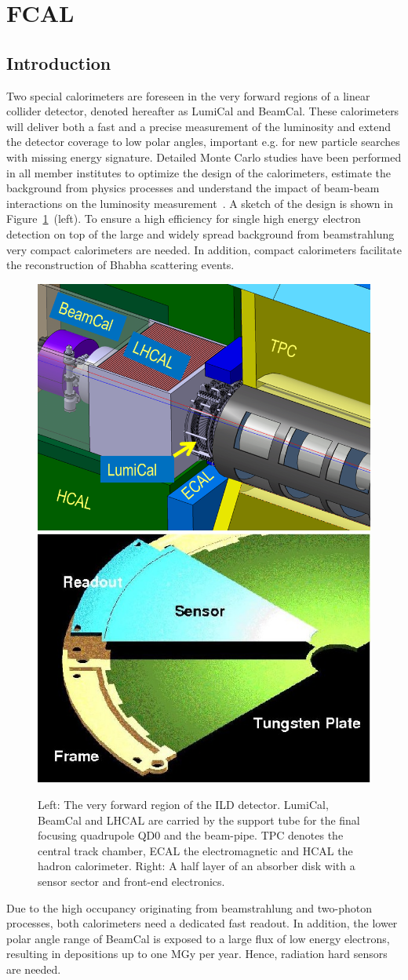 \section{FCAL}
\subsection{Introduction}
Two special calorimeters are foreseen in the very forward regions of a linear collider detector, denoted hereafter as
LumiCal and BeamCal.
These calorimeters will deliver both a fast and a precise measurement of the luminosity
and extend the detector coverage to low polar angles,
important e.g. for new particle searches with missing energy signature.
Detailed Monte Carlo studies have been performed in all member institutes to
optimize the design of the calorimeters, estimate the background from physics processes and understand the impact
of beam-beam interactions on the luminosity measurement~\cite{2010JInst...512002A}.
A sketch of the design is shown in Figure~\ref{fig:Forward_structure}~(left).
To ensure a high efficiency for single high energy electron detection on top of the large and widely spread
background from beamstrahlung  very compact calorimeters are needed. In addition, compact calorimeters facilitate
the reconstruction of Bhabha scattering events.
\begin{figure}[hbp]
  \centering
   \includegraphics[width=0.45\columnwidth]{Calorimeter/FCAL/figs/forward_region_new} \hfill
   \includegraphics[width=0.45\columnwidth]{Calorimeter/FCAL/figs/BClayer}
  \caption{Left: The very forward region of the ILD detector.
  LumiCal, BeamCal and LHCAL are carried by
  the support tube for the final focusing quadrupole QD0 and the beam-pipe.
  TPC denotes the central track chamber, ECAL the electromagnetic and
  HCAL the hadron calorimeter.
  Right: A half layer of an absorber disk with a sensor sector and front-end electronics.}
  \label{fig:Forward_structure}
\end{figure}
Due to the high occupancy originating from beamstrahlung and two-photon processes,
both calorimeters need a dedicated fast readout.
In addition, the lower polar angle range of BeamCal is exposed to a large flux
of low energy electrons, resulting in depositions up to one
MGy per year. Hence, radiation hard sensors are needed.

